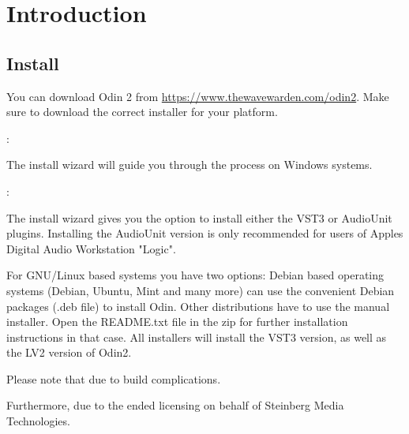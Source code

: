 \chapter{Introduction}


\section{Install}
You can download Odin 2 from \url{https://www.thewavewarden.com/odin2}. Make sure to download the correct installer for your platform.

\vspace{3mm}
:

The install wizard will guide you through the process on Windows systems.

\vspace{3mm}
:

The install wizard gives you the option to install either the VST3 or AudioUnit plugins. Installing the AudioUnit version is only recommended for users of Apples Digital Audio Workstation "Logic".

\vspace{3mm}

For GNU/Linux based systems you have two options: Debian based operating systems (Debian, Ubuntu, Mint and many more) can use the convenient Debian packages (.deb file) to install Odin. Other distributions have to use the manual installer. Open the README.txt file in the zip for further installation instructions in that case.
All installers will install the VST3 version, as well as the LV2 version of Odin2.

\vspace{5mm}
\begin{tcolorbox}[colback=yellow!10!white,
    colframe=white!20!black,
    center,
    valign=top,
    halign=left,
    center title,
    width=\textwidth]

    Please note that  due to build complications.
    
    Furthermore, due to the ended licensing on behalf of Steinberg Media Technologies.
\end{tcolorbox}

\vspace{5mm}

